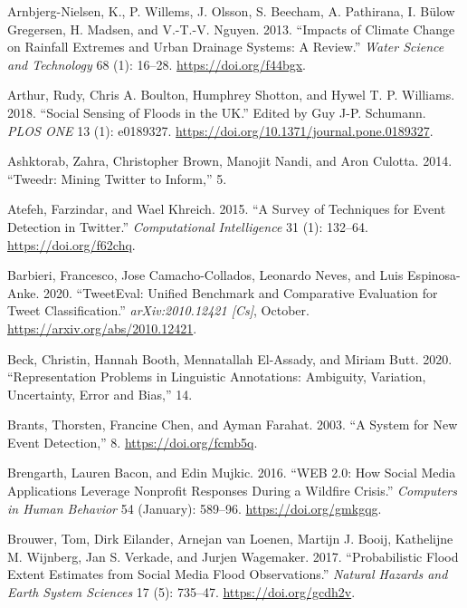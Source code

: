 \documentclass[a4paper, notitlepage]{extreport}
\newlength{\cslhangindent}
\newenvironment{CSLReferences}[2] %
 {%
  \setlength{\parindent}{0pt}
  \ifodd #1 \everypar{\setlength{\hangindent}{\cslhangindent}}\ignorespaces\fi
  \ifnum #2 > 0
  \setlength{\parskip}{#2\baselineskip}
  \fi
 }%
 {}
\begin{document}
\hypertarget{refs}{}
\begin{CSLReferences}{1}{0}
\leavevmode{}%
Arnbjerg-Nielsen, K., P. Willems, J. Olsson, S. Beecham, A. Pathirana,
I. Bülow Gregersen, H. Madsen, and V.-T.-V. Nguyen. 2013. {``Impacts of
Climate Change on Rainfall Extremes and Urban Drainage Systems: A
Review.''} \emph{Water Science and Technology} 68 (1): 16--28.
\url{https://doi.org/f44bgx}.

\leavevmode{}%
Arthur, Rudy, Chris A. Boulton, Humphrey Shotton, and Hywel T. P.
Williams. 2018. {``Social Sensing of Floods in the {UK}.''} Edited by
Guy J-P. Schumann. \emph{PLOS ONE} 13 (1): e0189327.
\url{https://doi.org/10.1371/journal.pone.0189327}.

\leavevmode{}%
Ashktorab, Zahra, Christopher Brown, Manojit Nandi, and Aron Culotta.
2014. {``Tweedr: {Mining Twitter} to {Inform},''} 5.

\leavevmode{}%
Atefeh, Farzindar, and Wael Khreich. 2015. {``A {Survey} of {Techniques}
for {Event Detection} in {Twitter}.''} \emph{Computational Intelligence}
31 (1): 132--64. \url{https://doi.org/f62chq}.

\leavevmode{}%
Barbieri, Francesco, Jose Camacho-Collados, Leonardo Neves, and Luis
Espinosa-Anke. 2020. {``{TweetEval}: {Unified Benchmark} and
{Comparative Evaluation} for {Tweet Classification}.''}
\emph{arXiv:2010.12421 {[}Cs{]}}, October.
\url{https://arxiv.org/abs/2010.12421}.

\leavevmode{}%
Beck, Christin, Hannah Booth, Mennatallah El-Assady, and Miriam Butt.
2020. {``Representation {Problems} in {Linguistic Annotations}:
{Ambiguity}, {Variation}, {Uncertainty}, {Error} and {Bias},''} 14.

\leavevmode{}%
Brants, Thorsten, Francine Chen, and Ayman Farahat. 2003. {``A {System}
for {New Event Detection},''} 8. \url{https://doi.org/fcmb5q}.

\leavevmode{}%
Brengarth, Lauren Bacon, and Edin Mujkic. 2016. {``{WEB} 2.0: {How}
Social Media Applications Leverage Nonprofit Responses During a Wildfire
Crisis.''} \emph{Computers in Human Behavior} 54 (January): 589--96.
\url{https://doi.org/gmkgqg}.

\leavevmode{}%
Brouwer, Tom, Dirk Eilander, Arnejan van Loenen, Martijn J. Booij,
Kathelijne M. Wijnberg, Jan S. Verkade, and Jurjen Wagemaker. 2017.
{``Probabilistic Flood Extent Estimates from Social Media Flood
Observations.''} \emph{Natural Hazards and Earth System Sciences} 17
(5): 735--47. \url{https://doi.org/gcdh2v}.


\end{CSLReferences}
\end{document}
